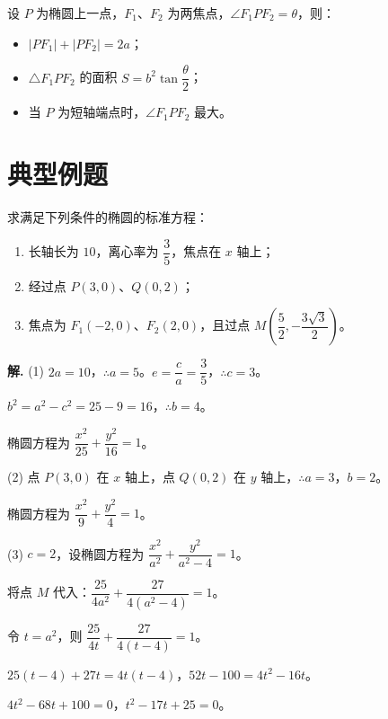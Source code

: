 \documentclass[11pt]{ctexrep}
\begin{document}
\begin{property}[焦点三角形]
    设 $P$ 为椭圆上一点，$F_1$、$F_2$ 为两焦点，$\angle F_1PF_2 = \theta$，则：
    \begin{itemize}
        \item $|PF_1| + |PF_2| = 2a$；
        \item $\triangle F_1PF_2$ 的面积 $S = b^2 \tan\dfrac{\theta}{2}$；
        \item 当 $P$ 为短轴端点时，$\angle F_1PF_2$ 最大。
    \end{itemize}
\end{property}

\section*{典型例题}

\begin{example}[求椭圆的标准方程]
    求满足下列条件的椭圆的标准方程：
    \begin{enumerate}
        \item 长轴长为 $10$，离心率为 $\dfrac{3}{5}$，焦点在 $x$ 轴上；
        \item 经过点 $P(3, 0)$、$Q(0, 2)$；
        \item 焦点为 $F_1(-2, 0)$、$F_2(2, 0)$，且过点 $M\left(\dfrac{5}{2}, -\dfrac{3\sqrt{3}}{2}\right)$。
    \end{enumerate}
\end{example}

\textbf{解.} (1) $2a = 10$，$\therefore a = 5$。$e = \dfrac{c}{a} = \dfrac{3}{5}$，$\therefore c = 3$。

$b^2 = a^2 - c^2 = 25 - 9 = 16$，$\therefore b = 4$。

椭圆方程为 $\boxed{\dfrac{x^2}{25} + \dfrac{y^2}{16} = 1}$。

(2) 点 $P(3, 0)$ 在 $x$ 轴上，点 $Q(0, 2)$ 在 $y$ 轴上，$\therefore a = 3$，$b = 2$。

椭圆方程为 $\boxed{\dfrac{x^2}{9} + \dfrac{y^2}{4} = 1}$。

(3) $c = 2$，设椭圆方程为 $\dfrac{x^2}{a^2} + \dfrac{y^2}{a^2 - 4} = 1$。

将点 $M$ 代入：$\dfrac{25}{4a^2} + \dfrac{27}{4(a^2 - 4)} = 1$。

令 $t = a^2$，则 $\dfrac{25}{4t} + \dfrac{27}{4(t - 4)} = 1$。

$25(t - 4) + 27t = 4t(t - 4)$，$52t - 100 = 4t^2 - 16t$。

$4t^2 - 68t + 100 = 0$，$t^2 - 17t + 25 = 0$。
\end{document}
